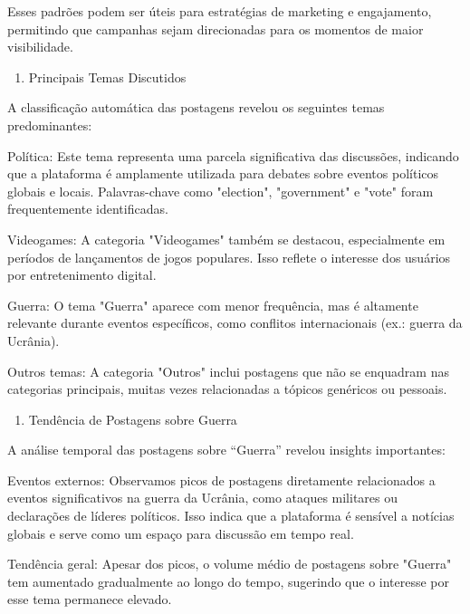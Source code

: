 \documentclass[
  letterpaper,
  DIV=11,
  numbers=noendperiod]{scrartcl}
\providecommand{\tightlist}{%
  \setlength{\itemsep}{0pt}\setlength{\parskip}{0pt}}\usepackage{longtable,booktabs,array}
\begin{document}
Esses padrões podem ser úteis para estratégias de marketing e
engajamento, permitindo que campanhas sejam direcionadas para os
momentos de maior visibilidade.

\begin{enumerate}
\def\labelenumi{\Roman{enumi}.}
\setcounter{enumi}{1}
\tightlist
\item
  Principais Temas Discutidos
\end{enumerate}

A classificação automática das postagens revelou os seguintes temas
predominantes:

\begin{VerbatimWithBreaks}
Política:  Este tema representa uma parcela significativa das discussões, indicando que a plataforma é amplamente utilizada para debates sobre eventos políticos globais e locais. Palavras-chave como "election", "government" e "vote" foram frequentemente identificadas. 

Videogames:  A categoria "Videogames" também se destacou, especialmente em períodos de lançamentos de jogos populares. Isso reflete o interesse dos usuários por entretenimento digital. 

Guerra:  O tema "Guerra" aparece com menor frequência, mas é altamente relevante durante eventos específicos, como conflitos internacionais (ex.: guerra da Ucrânia). 

Outros temas:  A categoria "Outros" inclui postagens que não se enquadram nas categorias principais, muitas vezes relacionadas a tópicos genéricos ou pessoais. 
 
\end{VerbatimWithBreaks}

\begin{enumerate}
\def\labelenumi{\Roman{enumi}.}
\setcounter{enumi}{2}
\tightlist
\item
  Tendência de Postagens sobre Guerra
\end{enumerate}

A análise temporal das postagens sobre ``Guerra'' revelou insights
importantes:

\begin{VerbatimWithBreaks}
Eventos externos:  Observamos picos de postagens diretamente relacionados a eventos significativos na guerra da Ucrânia, como ataques militares ou declarações de líderes políticos. Isso indica que a plataforma é sensível a notícias globais e serve como um espaço para discussão em tempo real. 

Tendência geral:  Apesar dos picos, o volume médio de postagens sobre "Guerra" tem aumentado gradualmente ao longo do tempo, sugerindo que o interesse por esse tema permanece elevado. 
 
\end{VerbatimWithBreaks}
\end{document}
